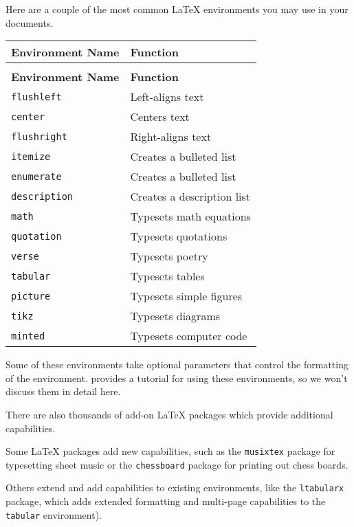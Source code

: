 Here are a couple of the most common \LaTeX{} environments you may use in your
documents.

\begin{tabularx}{\linewidth}{|l|l|}
  \caption{Common \LaTeX{} Environments}  \\
  \hline
  \textbf{Environment Name} & \textbf{Function} \\
  \hline
  \endfirsthead
  \caption{Common \LaTeX{} Environments (continued)} \\
  \hline
  \textbf{Environment Name} & \textbf{Function} \\
  \hline
  \endhead
  \texttt{flushleft}        & Left-aligns text \\
  \texttt{center}           & Centers text \\
  \texttt{flushright}       & Right-aligns text \\
  \hline
  \texttt{itemize}          & Creates a bulleted list \\
  \texttt{enumerate}        & Creates a bulleted list \\
  \texttt{description}      & Creates a description list \\
  \hline
  \texttt{math}             & Typesets math equations \\
  \texttt{quotation}        & Typesets quotations \\
  \texttt{verse}            & Typesets poetry \\
  \texttt{tabular}          & Typesets tables \\
  \texttt{picture}          & Typesets simple figures \\
  \texttt{tikz}             & Typesets diagrams \\
  \texttt{minted}           & Typesets computer code \\
  \hline
\end{tabularx}

Some of these environments take optional parameters that control the
formatting of the environment. \cite{lshort} provides a tutorial for using
these environments, so we won't discuss them in detail here.

There are also thousands of add-on \LaTeX{} packages which provide additional
capabilities.

Some \LaTeX{} packages add new capabilities, such as the \texttt{musixtex}
package for typesetting sheet music or the \texttt{chessboard} package for
printing out chess boards.

Others extend and add capabilities to existing environments, like the
\texttt{ltabularx} package, which adds extended formatting and multi-page
capabilities to the \texttt{tabular} environment).

